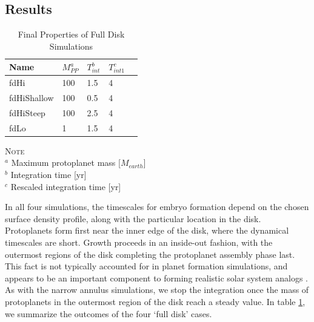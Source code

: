 \documentclass[twocolumn]{aastex63}
\begin{document}
\subsection{Results}

\begin{table}
\caption{Final Properties of Full Disk Simulations}
\begin{tabular}{lllll} \hline \hline
Name     & $M_{PP}^a$ & $T_{int}^b$ & $T_{int 1}^c$ &  \\ \hline
fdHi                 & 100                                                         & 1.5                              & 4  &  \\
fdHiShallow     & 100                                                        & 0.5                              & 4  &  \\
fdHiSteep       & 100                                                         & 2.5                              & 4 &  \\
fdLo                & 1                                                             & 1.5                              & 4 &  \\ \hline
\end{tabular}
\label{tab:sim_properties}
\begin{flushleft}
\textsc{Note} \\ {$^a$ Maximum protoplanet mass [$M_{earth}$] \\
		       $^b$ Integration time [yr] \\
		       $^c$ Rescaled integration time [yr]} \\
\end{flushleft}
\end{table}

In all four simulations, the timescales for embryo formation depend on the chosen surface density profile, along with the particular location in the disk. Protoplanets form first near the inner edge of the disk, where the dynamical timescales are short. Growth proceeds in an inside-out fashion, with the outermost regions of the disk completing the protoplanet assembly phase last. This fact is not typically accounted for in planet formation simulations, and appears to be an important component to forming realistic solar system analogs \citep{clement20}. As with the narrow annulus simulations, we stop the integration once the mass of protoplanets in the outermost region of the disk reach a steady value. In table \ref{tab:sim_properties}, we summarize the outcomes of the four `full disk' cases.
\end{document}
